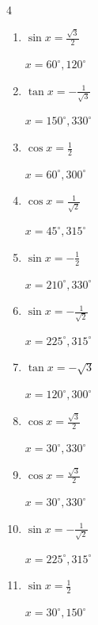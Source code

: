 \begin{multicols}{4}
\begin{enumerate}
        $\displaystyle x = 30^{\circ} , 150^{\circ}$

  \item $\displaystyle \sin{x}  = \frac{\sqrt{3}}{2}$

        $\displaystyle x = 60^{\circ} , 120^{\circ}$

  \item $\displaystyle \tan{x}  = -\frac{1}{\sqrt{3}}$

        $\displaystyle x = 150^{\circ} , 330^{\circ}$

  \item $\displaystyle \cos{x}  = \frac{1}{2}$

        $\displaystyle x = 60^{\circ} , 300^{\circ}$

  \item $\displaystyle \cos{x}  = \frac{1}{\sqrt{2}}$

        $\displaystyle x = 45^{\circ} , 315^{\circ}$

  \item $\displaystyle \sin{x}  = -\frac{1}{2}$

        $\displaystyle x = 210^{\circ} , 330^{\circ}$

  \item $\displaystyle \sin{x}  = -\frac{1}{\sqrt{2}}$

        $\displaystyle x = 225^{\circ} , 315^{\circ}$

\columnbreak %

  \item $\displaystyle \tan{x}  = -\sqrt{3}$

        $\displaystyle x = 120^{\circ} , 300^{\circ}$

  \item $\displaystyle \cos{x}  = \frac{\sqrt{3}}{2}$

        $\displaystyle x = 30^{\circ} , 330^{\circ}$

  \item $\displaystyle \cos{x}  = \frac{\sqrt{3}}{2}$

        $\displaystyle x = 30^{\circ} , 330^{\circ}$

  \item $\displaystyle \sin{x}  = -\frac{1}{\sqrt{2}}$

        $\displaystyle x = 225^{\circ} , 315^{\circ}$

  \item $\displaystyle \sin{x}  = \frac{1}{2}$

        $\displaystyle x = 30^{\circ} , 150^{\circ}$


\end{enumerate}
\end{multicols}
